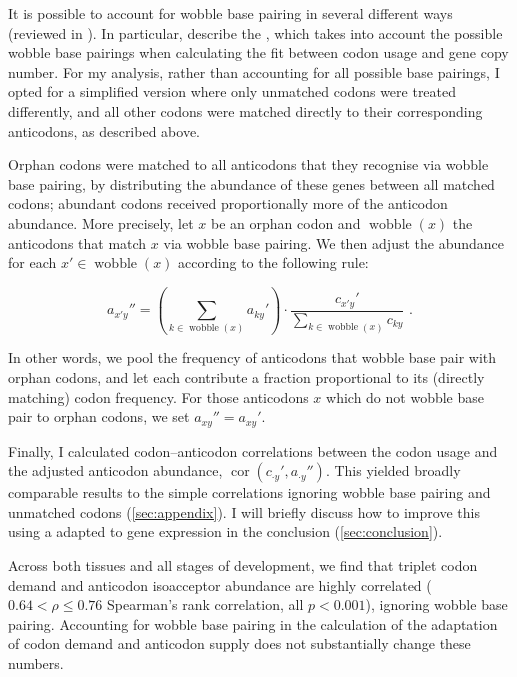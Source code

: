 It is possible to account for wobble base pairing in several different ways
(reviewed in \citet{Gingold:2011}). In particular, \citet{Dos_Reis:2003}
describe the \tai, which takes into account the possible wobble base pairings
when calculating the fit between codon usage and \trna gene copy number. For my
analysis, rather than accounting for all possible base pairings, I opted for a
simplified version where only unmatched codons were treated differently, and all
other codons were matched directly to their corresponding anticodons, as
described above.

Orphan codons were matched to all anticodons that they recognise via wobble base
pairing, by distributing the \trna abundance of these \trna genes between all
matched codons; abundant codons received proportionally more of the anticodon
abundance. More precisely, let \(x\) be an orphan codon and
\(\operatorname{wobble}(x)\) the anticodons that match \(x\) via wobble base
pairing. We then adjust the abundance for each \(x' \in
\operatorname{wobble}(x)\) according to the following rule:

\begin{equation}
    a_{x'y}'' = \left(\sum_{k \in \operatorname{wobble}(x)} a_{ky}'\right) \cdot
        \frac{c_{x'y}'}{\sum_{k \in \operatorname{wobble}(x)} c_{ky}} \text{\ .}
\end{equation}

In other words, we pool the frequency of anticodons that wobble base pair with
orphan codons, and let each contribute a fraction proportional to its (directly
matching) codon frequency. For those anticodons \(x\) which do not wobble base
pair to orphan codons, we set \(a_{xy}'' = a_{xy}'\).

Finally, I calculated codon--anticodon correlations between the codon usage and
the adjusted anticodon abundance, \(\operatorname{cor}(c_{\cdot y}', a_{\cdot
y}'')\). This yielded broadly comparable results to the simple correlations
ignoring wobble base pairing and unmatched codons (\cref{sec:appendix}). I will
briefly discuss how to improve this using a \tai adapted to \trna gene
expression in the conclusion (\cref{sec:conclusion}).

Across both tissues and all stages of development, we find that \mrna triplet
codon demand and \trna anticodon isoacceptor abundance are highly correlated
(\(0.64 < \rho \leq 0.76\) Spearman’s rank correlation, all \(p < 0.001\)),
ignoring wobble base pairing. Accounting for wobble base pairing in the
calculation of the adaptation of codon demand and anticodon supply does not
substantially change these numbers.

